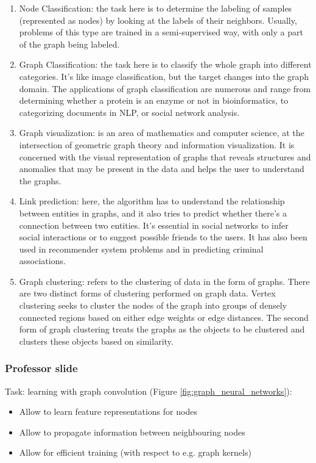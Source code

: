 \begin{enumerate}
    \item Node Classification: the task here is to determine the labeling of samples (represented as nodes) by looking at the labels of their neighbors. Usually, problems of this type are trained in a semi-supervised way, with only a part of the graph being labeled.
    
    \item Graph Classification: the task here is to classify the whole graph into different categories. It’s like image classification, but the target changes into the graph domain. The applications of graph classification are numerous and range from determining whether a protein is an enzyme or not in bioinformatics, to categorizing documents in NLP, or social network analysis.
    
    \item Graph visualization: is an area of mathematics and computer science, at the intersection of geometric graph theory and information visualization. It is concerned with the visual representation of graphs that reveals structures and anomalies that may be present in the data and helps the user to understand the graphs.
    
    \item Link prediction: here, the algorithm has to understand the relationship between entities in graphs, and it also tries to predict whether there’s a connection between two entities. It’s essential in social networks to infer social interactions or to suggest possible friends to the users. It has also been used in recommender system problems and in predicting criminal associations.
    
    \item Graph clustering:  refers to the clustering of data in the form of graphs. There are two distinct forms of clustering performed on graph data. Vertex clustering seeks to cluster the nodes of the graph into groups of densely connected regions based on either edge weights or edge distances. The second form of graph clustering treats the graphs as the objects to be clustered and clusters these objects based on similarity. 
\end{enumerate}

\subsubsection{Professor slide}
Task: learning with graph convolution (Figure \ref{fig:graph_neural_networks}):
\begin{itemize}
    \item Allow to learn feature representations for nodes
    
    \item Allow to propagate information between neighbouring nodes
    
    \item Allow for efficient training (with respect to e.g. graph kernels)
\end{itemize}





